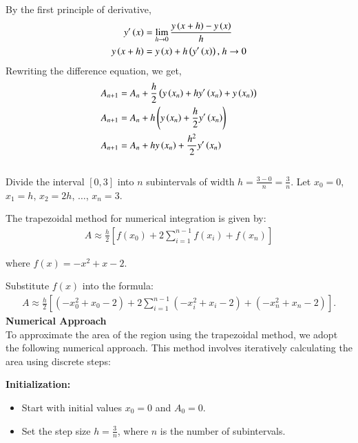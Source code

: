 \documentclass[article]{IEEEtran}
\numberwithin{figure}{enumi}
\begin{document}
By the first principle of derivative,
\begin{align}
    y^{\prime}\left(x\right) &= \lim_{h\to0} \frac{y\left(x + h\right) - y\left(x\right)}{h}\\
    y\left(x + h\right) &= y\left(x\right) + h\left(y^{\prime}\left(x\right)\right) \text{, } h\to0
\end{align}
Rewriting the difference equation, we get,
\begin{align}
    A_{n + 1} &= A_n + \frac{h}{2}\left(y\left(x_n\right) + hy^{\prime}\left(x_n\right) + y\left(x_n\right)\right)\\
    A_{n + 1} &= A_n + h\left(y\left(x_n\right) + \frac{h}{2}y^{\prime}\left(x_n\right)\right)\\
    A_{n + 1} &= A_n + hy\left(x_n\right) + \frac{h^2}{2}y^{\prime}\left(x_n\right)
\end{align}\\
Divide the interval $[0, 3]$ into $n$ subintervals of width $h = \frac{3-0}{n} = \frac{3}{n}$. Let $x_0 = 0$, $x_1 = h$, $x_2 = 2h$, $\dots$, $x_n = 3$.

The trapezoidal method for numerical integration is given by:
\begin{align}
  A \approx \frac{h}{2} \left[ f(x_0) + 2\sum_{i=1}^{n-1} f(x_i) + f(x_n) \right]  
\end{align}

where $f(x) = -x^2 + x - 2$.

Substitute $f(x)$ into the formula:
\begin{align}
    A \approx \frac{h}{2} \left[ (-x_0^2 + x_0 - 2) + 2\sum_{i=1}^{n-1} (-x_i^2 + x_i - 2) + (-x_n^2 + x_n - 2) \right].
\end{align}
\textbf{Numerical Approach}\\

To approximate the area of the region using the trapezoidal method, we adopt the following numerical approach. This method involves iteratively calculating the area using discrete steps:

\textbf{Initialization:}
\begin{itemize}
    \item Start with initial values $x_0 = 0$ and $A_0 = 0$.
    \item Set the step size $h = \frac{3}{n}$, where $n$ is the number of subintervals.
\end{itemize}
\end{document}
